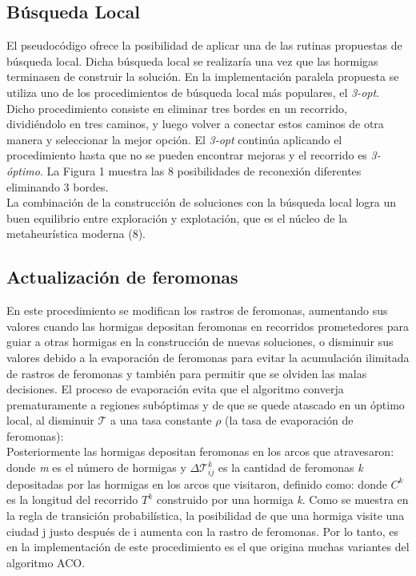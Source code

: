 \subsection{B\'usqueda Local}
El pseudoc\'odigo ofrece la posibilidad de aplicar una de las rutinas propuestas de b\'usqueda local. Dicha b\'usqueda local se realizar\'ia una vez que las hormigas terminasen de construir la soluci\'on. En la implementaci\'on paralela propuesta se utiliza uno de los procedimientos de b\'usqueda local m\'as populares, el \textit{3-opt}. Dicho procedimiento consiste en eliminar tres bordes en un recorrido, dividi\'endolo en tres caminos, y luego volver a conectar estos caminos de otra manera y seleccionar la mejor opci\'on. El \textit{3-opt} contin\'ua aplicando el procedimiento hasta que no se pueden encontrar mejoras y el recorrido es \textit{3-\'optimo}. La Figura 1 muestra las 8 posibilidades de reconexi\'on diferentes eliminando 3 bordes.\\
La combinaci\'on de la construcci\'on de soluciones con la b\'usqueda local logra un buen equilibrio entre exploraci\'on y explotaci\'on, que es el n\'ucleo de la metaheur\'istica moderna (8).\\
\subsection{Actualizaci\'on de feromonas}
En este procedimiento se modifican los rastros de feromonas, aumentando sus valores cuando las hormigas depositan feromonas en recorridos prometedores para guiar a otras hormigas en la construcci\'on de nuevas soluciones, o disminuir sus valores debido a la evaporaci\'on de feromonas para evitar la acumulaci\'on ilimitada de rastros de feromonas y tambi\'en para permitir que se olviden las malas decisiones.
El proceso de evaporaci\'on evita que el algoritmo converja prematuramente a regiones sub\'optimas y de que se quede atascado en un \'optimo local, al disminuir $\mathcal{T}$ a una tasa constante $\rho$ (la tasa de evaporaci\'on de feromonas):\\
Posteriormente las hormigas depositan feromonas en los arcos que atravesaron:\\
donde \textit{m} es el n\'umero de hormigas y \textit{$\Delta\mathcal{T}^{k}_{ij}$} es la cantidad de feromonas \textit{k} depositadas por las hormigas en los arcos que visitaron, definido
como:
donde \textit{$C^{k}$} es la longitud del recorrido \textit{$T^{k}$} construido por una hormiga \textit{k}.
Como se muestra en la regla de transici\'on probabil\'istica, la posibilidad de que una hormiga visite una ciudad j justo despu\'es de i aumenta con la
rastro de feromonas. Por lo tanto, es en la implementaci\'on de este procedimiento es el que origina muchas variantes del algoritmo ACO.

